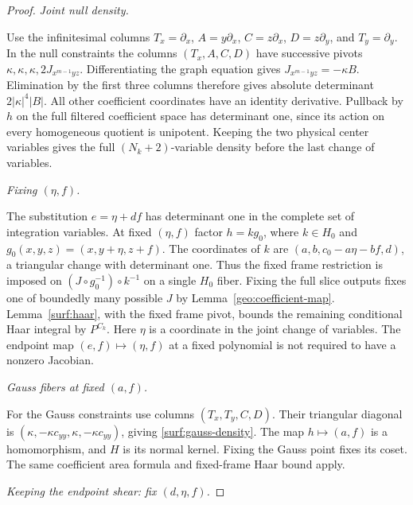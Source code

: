 \documentclass[11pt]{amsart}
\theoremstyle{definition}
\theoremstyle{remark}
\numberwithin{equation}{section}
\begin{document}
\begin{proof}
\par\medskip\noindent\textit{Joint null density.}\par\nobreak\smallskip

Use the infinitesimal columns $T_x=\partial_x$, $A=y\partial_x$, $C=z\partial_x$, $D=z\partial_y$, and $T_y=\partial_y$. In the null constraints the columns $(T_x,A,C,D)$ have successive pivots $\kappa,\kappa,\kappa,2J_{x^{m-1}yz}$. Differentiating the graph equation gives $J_{x^{m-1}yz}=-\kappa B$. Elimination by the first three columns therefore gives absolute determinant $2|\kappa|^4|B|$. All other coefficient coordinates have an identity derivative. Pullback by $h$ on the full filtered coefficient space has determinant one, since its action on every homogeneous quotient is unipotent. Keeping the two physical center variables gives the full $(N_k+2)$-variable density before the last change of variables.

\par\medskip\noindent\textit{Fixing $(\eta,f)$.}\par\nobreak\smallskip

The substitution $e=\eta+df$ has determinant one in the complete set of integration variables. At fixed $(\eta,f)$ factor $h=k g_0$, where $k\in H_0$ and $g_0(x,y,z)=(x,y+\eta,z+f)$. The coordinates of $k$ are $(a,b,c_0-a\eta-bf,d)$, a triangular change with determinant one. Thus the fixed frame restriction is imposed on $(J\circ g_0^{-1})\circ k^{-1}$ on a single $H_0$ fiber. Fixing the full slice outputs fixes one of boundedly many possible $J$ by Lemma~\ref{geo:coefficient-map}. Lemma~\ref{surf:haar}, with the fixed frame pivot, bounds the remaining conditional Haar integral by $P^{C_k}$. Here $\eta$ is a coordinate in the joint change of variables. The endpoint map $(e,f)\mapsto(\eta,f)$ at a fixed polynomial is not required to have a nonzero Jacobian.

\par\medskip\noindent\textit{Gauss fibers at fixed $(a,f)$.}\par\nobreak\smallskip

For the Gauss constraints use columns $(T_x,T_y,C,D)$. Their triangular diagonal is $(\kappa,-\kappa c_{yy},\kappa,-\kappa c_{yy})$, giving \eqref{surf:gauss-density}. The map $h\mapsto(a,f)$ is a homomorphism, and $H$ is its normal kernel. Fixing the Gauss point fixes its coset. The same coefficient area formula and fixed-frame Haar bound apply.

\par\medskip\noindent\textit{Keeping the endpoint shear: fix $(d,\eta,f)$.}\par\nobreak\smallskip


\end{proof}
\end{document}
